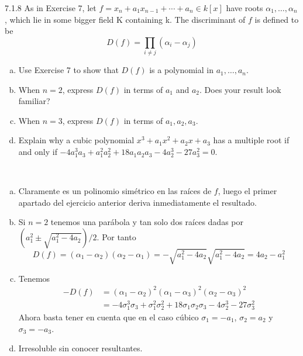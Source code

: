 \documentclass[twoside]{article}
\begin{document}
\newpage




\begin{ejercicio}{7.1.8}
As in Exercise 7, let $f = x_n +a_1x_{n−1} +\cdots + a_n ∈ k[x]$ have roots $α_1, \dotsc , α_n$, which lie
in some bigger field K containing k. The discriminant of $f$ is defined to be
$$
D( f) = \prod_{i\neq j}(\alpha_i - \alpha_j)
$$
\begin{enumerate}[a.]
\item Use Exercise 7 to show that $D( f )$ is a polynomial in $a_1, \dotsc, a_n$.
\item When $n = 2$, express $D( f )$ in terms of $a_1$ and $a_2$. Does your result look familiar?
\item  When $n = 3$, express $D( f )$ in terms of $a_1, a_2, a_3$.
\item Explain why a cubic polynomial $x^3 +a_1x^2 +a_2x+a_3$ has a multiple root if and only if $−4a^3_1a_3 + a^2_1a^2_2+ 18a_1a_2a_3 - 4a^3_2 - 27a^2_3= 0.$
\end{enumerate}
\end{ejercicio}

\begin{solucion}\
\begin{enumerate}[a.]
\item Claramente es un polinomio simétrico en las raíces de $f$, luego el primer apartado del ejercicio anterior deriva inmediatamente el resultado.
\item Si $n=2$ tenemos una parábola y tan solo dos raíces dadas por $(a_1^2\pm\sqrt{a_1^2-4a_2})/2$. Por tanto
$$
D(f)=(\alpha_1 - \alpha_2)(\alpha_2 - \alpha_1) =-\sqrt{a_1^2-4a_2}\sqrt{a_1^2-4a_2} = 4a_2 - a_1^2
$$
\item Tenemos
\begin{align*}
-D(f)&=(\alpha_1-\alpha_2)^2(\alpha_1-\alpha_3)^2(\alpha_2-\alpha_3)^2\\
&=-4\sigma_1^3\sigma_3 + \sigma_1^2\sigma_2^2 + 18\sigma_1\sigma_2\sigma_3 - 4\sigma_2^3 - 27\sigma_3^2
\end{align*}
Ahora basta tener en cuenta que en el caso cúbico $\sigma_1 = -a_1$, $\sigma_2 = a_2$ y $\sigma_3 = -a_3$.
\item Irresoluble sin conocer resultantes.
\end{enumerate}
\end{solucion}
\end{document}
